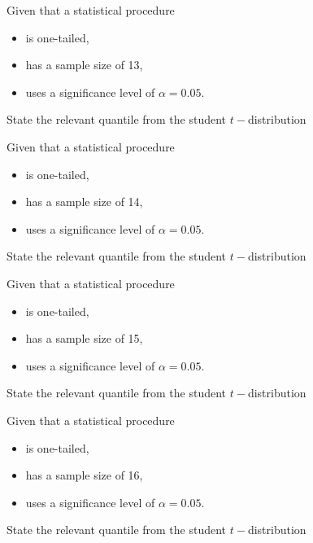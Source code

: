 \documentclass[12pt, a4paper]{report}
\theoremstyle{definition}
\theoremstyle{remark}
\begin{document}

	
	
	
	Given that a statistical procedure 
	\begin{itemize}
		\item is one-tailed,
		\item has a sample size of 13,
		\item uses a significance level of $\alpha = 0.05$.
	\end{itemize} \smallskip
	State the relevant quantile from the student $t-$distribution
	


	
	
	
	Given that a statistical procedure 
	\begin{itemize}
		\item is one-tailed,
		\item has a sample size of 14,
		\item uses a significance level of $\alpha = 0.05$.
	\end{itemize} \smallskip
	State the relevant quantile from the student $t-$distribution
	


	
	
	
	Given that a statistical procedure
	\begin{itemize}
		\item is one-tailed,
		\item has a sample size of 15,
		\item uses a significance level of $\alpha = 0.05$.
	\end{itemize} \smallskip
	State the relevant quantile from the student $t-$distribution
	


	
	
	
	Given that a statistical procedure 
	\begin{itemize}
		\item is one-tailed,
		\item has a sample size of 16,
		\item uses a significance level of $\alpha = 0.05$.
	\end{itemize} \smallskip
	State the relevant quantile from the student $t-$distribution
	


\end{document}
